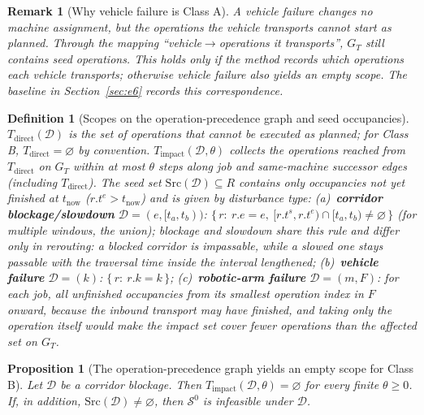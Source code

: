 \documentclass[manuscript,screen,review]{acmart}
\newtheorem{definition}{Definition}
\newtheorem{remark}{Remark}
\newtheorem{prop}{Proposition}
\begin{document}
\begin{remark}[Why vehicle failure is Class A]
\label{rem:agv_class}
A vehicle failure changes no machine assignment, but the operations the vehicle transports cannot start as planned. Through the mapping ``vehicle\(\to\)operations it transports'',
\(G_T\) still contains seed operations. This holds only if the method records which operations each vehicle transports; otherwise vehicle failure also yields an empty scope. The baseline in Section~\ref{sec:e6} records this correspondence.
\end{remark}

\begin{definition}[Scopes on the operation-precedence graph and seed occupancies]
\label{def:task_impact}
\label{def:seeds}
\(T_{\mathrm{direct}}(\mathcal{D})\) is the set of operations that cannot be executed as planned; for Class B, \(T_{\mathrm{direct}}=\varnothing\) by convention.
\(T_{\mathrm{impact}}(\mathcal{D},\theta)\) collects the operations reached from \(T_{\mathrm{direct}}\) on \(G_T\) within at most \(\theta\) steps along job and same-machine successor edges (including \(T_{\mathrm{direct}}\)).
The seed set \(\mathrm{Src}(\mathcal{D})\subseteq R\) contains only occupancies not yet finished at \(t_{\mathrm{now}}\) (\(r.t^e>t_{\mathrm{now}}\)) and is given by disturbance type:
(a)~\textbf{corridor blockage/slowdown} \(\mathcal{D}=(e,[t_a,t_b))\): \(\{\,r:\ r.e=e,\ [r.t^s,r.t^e)\cap[t_a,t_b)\neq\varnothing\,\}\) (for multiple windows, the union);
blockage and slowdown share this rule and differ only in rerouting: a blocked corridor is impassable, while a slowed one stays passable with the traversal time inside the interval lengthened;
(b)~\textbf{vehicle failure} \(\mathcal{D}=(k)\): \(\{\,r:\ r.k=k\,\}\);
(c)~\textbf{robotic-arm failure} \(\mathcal{D}=(m,F)\): for each job, all unfinished occupancies from its smallest operation index in \(F\) onward, because the inbound transport may have finished, and taking only the operation itself would make the impact set cover fewer operations than the affected set on \(G_T\).
\end{definition}

\begin{prop}[The operation-precedence graph yields an empty scope for Class B]
\label{prop:miss}
Let \(\mathcal{D}\) be a corridor blockage. Then \(T_{\mathrm{impact}}(\mathcal{D},\theta)=\varnothing\) for every finite \(\theta\ge 0\).
If, in addition, \(\mathrm{Src}(\mathcal{D})\neq\varnothing\), then \(\mathcal{S}^0\) is infeasible under \(\mathcal{D}\).
\end{prop}
\end{document}
